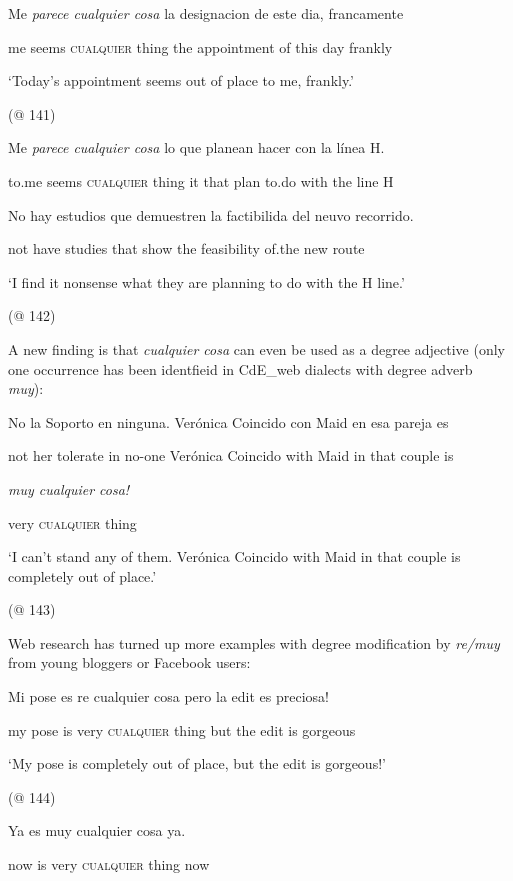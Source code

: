     Me  \textit{parece  cualquier  cosa} la  designacion  de  este  dia,  francamente

    me  seems  \textsc{cualquier}  thing  the  appointment  of  this  day  frankly

    ‘Today’s appointment seems out of place to me, frankly.’

    (@ 141)

    Me  \textit{parece  cualquier  cosa} lo  que  planean  hacer  con  la  línea H.

    to.me  seems  \textsc{cualquier}  thing  it  that  plan  to.do  with  the  line H

    No  hay  estudios  que  demuestren  la  factibilida  del  neuvo  recorrido.

    not  have  studies  that  show  the  feasibility  of.the  new  route

    ‘I find it nonsense what they are planning to do with the H line.’

    (@ 142)

A new finding is that \textit{cualquier cosa} can even be used as a degree adjective (only one occurrence has been identfieid in CdE\_web dialects with degree adverb \textit{muy}):

    No  la  Soporto  en  ninguna.  Verónica  Coincido  con  Maid  en  esa  pareja  es

    not  her  tolerate  in  no-one  Verónica  Coincido  with  Maid  in  that  couple  is

    \textit{muy  cualquier  cosa!} 

    very  \textsc{cualquier}  thing  

    ‘I can’t stand any of them. Verónica Coincido with Maid in that couple is completely out of place.’

    (@ 143) 

Web research has turned up more examples with degree modification by \textit{re/muy} from young bloggers or Facebook users:

    Mi  pose  es  re  cualquier  cosa  pero  la  edit  es  preciosa!

    my  pose  is  very  \textsc{cualquier}  thing  but  the  edit  is  gorgeous

    ‘My pose is completely out of place, but the edit is gorgeous!’

    (@ 144)

    Ya  es  muy  cualquier  cosa  ya.

    now  is  very  \textsc{cualquier}  thing  now

